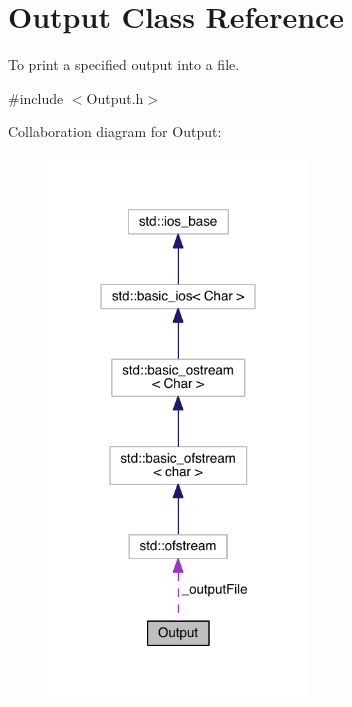 \hypertarget{classOutput}{\section{Output Class Reference}
\label{classOutput}
}


To print a specified output into a file.  




{\ttfamily \#include $<$Output.\+h$>$}



Collaboration diagram for Output\+:\nopagebreak
\begin{figure}[H]
\begin{center}
\leavevmode
\includegraphics[width=195pt]{classOutput__coll__graph}
\end{center}
\end{figure}
